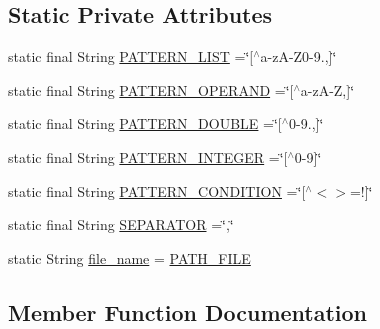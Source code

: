 \subsection*{Static Private Attributes}
\begin{DoxyCompactItemize}
\item 
static final String \hyperlink{classutilities_1_1_data_file_a25b4360923bcdd2e38e81df53297ee94}{P\+A\+T\+T\+E\+R\+N\+\_\+\+L\+I\+ST} =\char`\"{}\mbox{[}$^\wedge$a-\/zA-\/Z0-\/9.,\mbox{]}\char`\"{}
\item 
static final String \hyperlink{classutilities_1_1_data_file_aeb2abc62f5fe561e1425331c49c1a58d}{P\+A\+T\+T\+E\+R\+N\+\_\+\+O\+P\+E\+R\+A\+ND} =\char`\"{}\mbox{[}$^\wedge$a-\/zA-\/Z,\mbox{]}\char`\"{}
\item 
static final String \hyperlink{classutilities_1_1_data_file_ac00c547e129cb9c057f7a0d499015797}{P\+A\+T\+T\+E\+R\+N\+\_\+\+D\+O\+U\+B\+LE} =\char`\"{}\mbox{[}$^\wedge$0-\/9.,\mbox{]}\char`\"{}
\item 
static final String \hyperlink{classutilities_1_1_data_file_a51e037b86bf7cd4b6ce02a384d9ad6f2}{P\+A\+T\+T\+E\+R\+N\+\_\+\+I\+N\+T\+E\+G\+ER} =\char`\"{}\mbox{[}$^\wedge$0-\/9\mbox{]}\char`\"{}
\item 
static final String \hyperlink{classutilities_1_1_data_file_aee831317a6c670d621683dbfadf1d19f}{P\+A\+T\+T\+E\+R\+N\+\_\+\+C\+O\+N\+D\+I\+T\+I\+ON} =\char`\"{}\mbox{[}$^\wedge$$<$$>$=!\mbox{]}\char`\"{}
\item 
static final String \hyperlink{classutilities_1_1_data_file_ae7a89abc44a0f02d5b6205b6e2f53a06}{S\+E\+P\+A\+R\+A\+T\+OR} =\char`\"{},\char`\"{}
\item 
static String \hyperlink{classutilities_1_1_data_file_acc01b0a1464087e54962b7c6202dbb5f}{file\+\_\+name} = \hyperlink{classutilities_1_1_data_file_ab2cdae484f28934cf77316bbf9af0b72}{P\+A\+T\+H\+\_\+\+F\+I\+LE}
\end{DoxyCompactItemize}


\subsection{Member Function Documentation}
\mbox{\label{classutilities_1_1_data_file_a28beb850c6cc447aa7757e9f3967224c}} 
